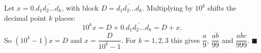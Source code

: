 Let $x=0.\overline{d_1d_2\ldots d_k}$, with block $D=\overline{d_1d_2\ldots d_k}$. Multiplying by $10^k$ shifts the decimal point $k$ places:
\[10^kx=D+0.\overline{d_1d_2\ldots d_k}=D+x.\]
So $\left(10^k-1\right)x=D$ and $x=\dfrac{D}{10^k-1}$. For $k=1,2,3$ this gives $\dfrac a9$, $\dfrac{\overline{ab}}{99}$ and $\dfrac{\overline{abc}}{999}$. $\blacksquare$
